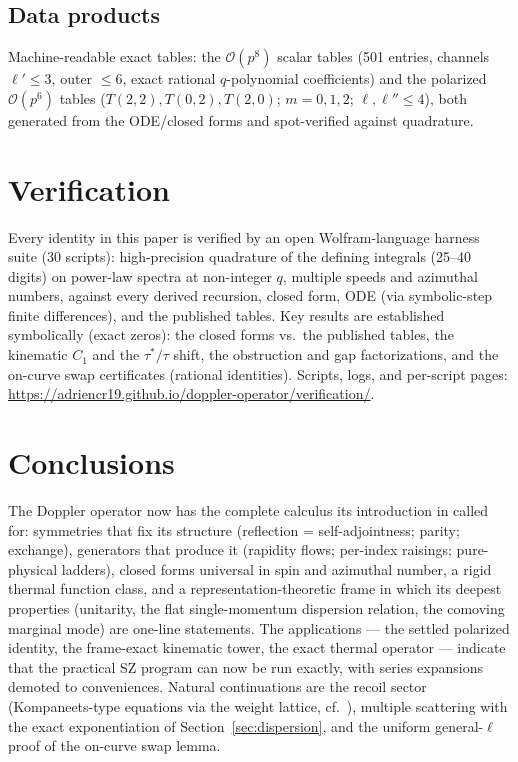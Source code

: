 \documentclass[useAMS,usenatbib]{article}
\begin{document}
\subsection{Data products}
Machine-readable exact tables: the $\mathcal O(p^8)$ scalar tables (501 entries, channels $\ell'\le3$, outer
$\le6$, exact rational $q$-polynomial coefficients) and the polarized $\mathcal O(p^6)$ tables
($T(2,2), T(0,2), T(2,0)$; $m = 0,1,2$; $\ell,\ell''\le4$), both generated from the ODE/closed forms and
spot-verified against quadrature.

\section{Verification}\label{sec:verification}
Every identity in this paper is verified by an open Wolfram-language harness suite (30 scripts): high-precision
quadrature of the defining integrals (25--40 digits) on power-law spectra at non-integer $q$, multiple speeds
and azimuthal numbers, against every derived recursion, closed form, ODE (via symbolic-step finite differences),
and the published tables. Key results are established symbolically (exact zeros): the closed forms vs.\ the
published tables, the kinematic $C_1$ and the $\tau^*/\tau$ shift, the obstruction and gap factorizations, and
the on-curve swap certificates (rational identities). Scripts, logs, and per-script pages:
\url{https://adriencr19.github.io/doppler-operator/verification/}.

\section{Conclusions}
The Doppler operator now has the complete calculus its introduction in \citet{RC26} called for: symmetries that
fix its structure (reflection = self-adjointness; parity; exchange), generators that produce it (rapidity flows;
per-index raisings; pure-physical ladders), closed forms universal in spin and azimuthal number, a rigid thermal
function class, and a representation-theoretic frame in which its deepest properties (unitarity, the flat
single-momentum dispersion relation, the comoving marginal mode) are one-line statements. The applications ---
the settled polarized identity, the frame-exact kinematic tower, the exact thermal operator --- indicate that
the practical SZ program can now be run exactly, with series expansions demoted to conveniences. Natural
continuations are the recoil sector (Kompaneets-type equations via the weight lattice, cf.\ \citealt{HLC26}),
multiple scattering with the exact exponentiation of Section~\ref{sec:dispersion}, and the uniform
general-$\ell$ proof of the on-curve swap lemma.
\end{document}
